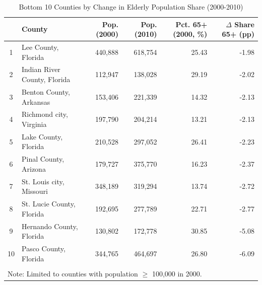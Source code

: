 \begin{table}[htbp]
\caption{Bottom 10 Counties by Change in Elderly Population Share (2000-2010)}
\label{tab:bottom10_elderly_change}
\begin{tabular}{clrrrr}
\toprule
 & County & Pop. (2000) & Pop. (2010) & Pct. 65+ (2000, \%) & $\Delta$ Share 65+ (pp) \\
\midrule
1 & Lee County, Florida & 440,888 & 618,754 & 25.43 & -1.98 \\
2 & Indian River County, Florida & 112,947 & 138,028 & 29.19 & -2.02 \\
3 & Benton County, Arkansas & 153,406 & 221,339 & 14.32 & -2.13 \\
4 & Richmond city, Virginia & 197,790 & 204,214 & 13.21 & -2.13 \\
5 & Lake County, Florida & 210,528 & 297,052 & 26.41 & -2.23 \\
6 & Pinal County, Arizona & 179,727 & 375,770 & 16.23 & -2.37 \\
7 & St. Louis city, Missouri & 348,189 & 319,294 & 13.74 & -2.72 \\
8 & St. Lucie County, Florida & 192,695 & 277,789 & 22.71 & -2.77 \\
9 & Hernando County, Florida & 130,802 & 172,778 & 30.85 & -5.08 \\
10 & Pasco County, Florida & 344,765 & 464,697 & 26.80 & -6.09 \\
\bottomrule
\\
\multicolumn{6}{l}{\footnotesize Note: Limited to counties with population $\geq$ 100,000 in 2000.} \\
\end{tabular}
\end{table}
